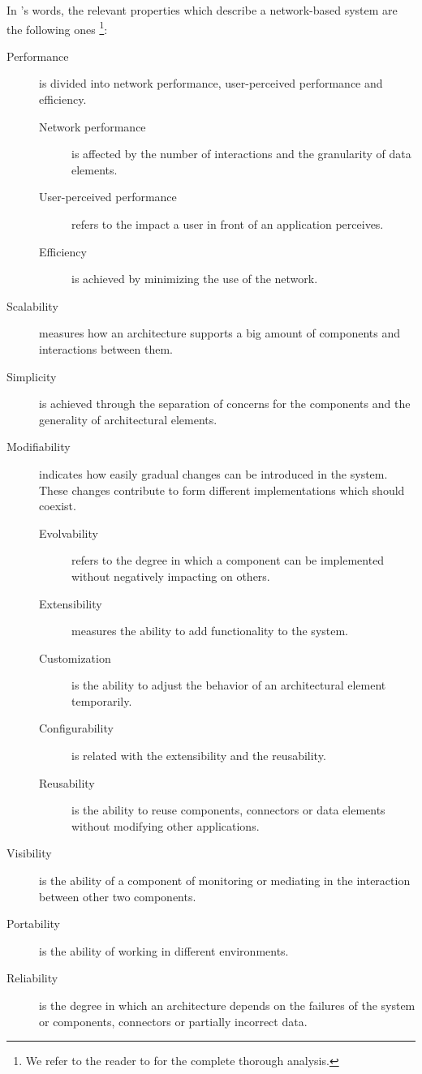 In \citeauthor{fielding_architectural_2000}'s words, the relevant properties which describe a network-based system are the following ones \footnote{We refer to the reader to \citet{fielding_architectural_2000} for the complete thorough analysis.}:
\begin{description}
  \item[Performance] is divided into network performance, user-perceived performance and efficiency.
    \begin{description}
      \item[Network performance] is affected by the number of interactions and the granularity of data elements.
      \item[User-perceived performance] refers to the impact a user in front of an application perceives. %
      \item[Efficiency] is achieved by minimizing the use of the network.
    \end{description}
  \item[Scalability] measures how an architecture supports a big amount of components and interactions between them.
  \item[Simplicity] is achieved through the separation of concerns for the components and the generality of architectural elements.
  \item[Modifiability] indicates how easily gradual changes can be introduced in the system.
                       These changes contribute to form different implementations which should coexist.
    \begin{description}
      \item[Evolvability] refers to the degree in which a component can be implemented without negatively impacting on others.
      \item[Extensibility] measures the ability to add functionality to the system.
      \item[Customization] is the ability to adjust the behavior of an architectural element temporarily.
      \item[Configurability] is related with the extensibility and the reusability.
      \item[Reusability] is the ability to reuse components, connectors or data elements without modifying other applications.
    \end{description}
  \item[Visibility] is the ability of a component of monitoring or mediating in the interaction between other two components.
  \item[Portability] is the ability of working in different environments.
  \item[Reliability] is the degree in which an architecture depends on the failures of the system or components, connectors or partially incorrect data.
\end{description}

